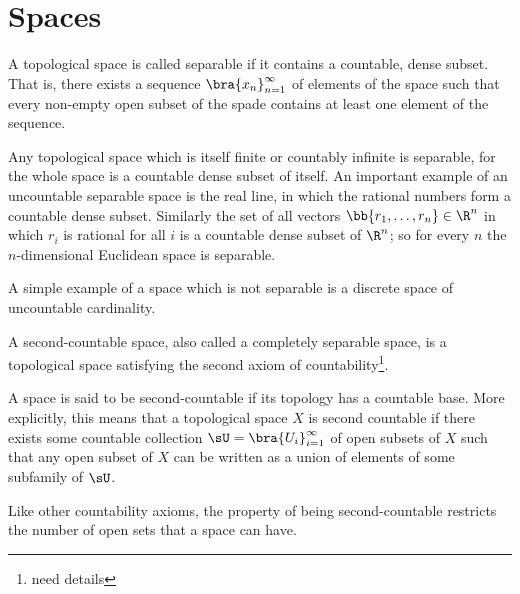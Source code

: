 \section{Spaces}

\begin{definition}\label{def:separable_space}
A topological space is called separable if it contains a countable, dense subset. That is, there exists a sequence $\bra{x_n}_{n=1}^\infty$ of elements of the space such that every non-empty open subset of the spade contains at least one element of the sequence.
\end{definition}

\begin{remark}
Any topological space which is itself finite or countably infinite is separable, for the whole space is a countable dense subset of itself. An important example of an uncountable separable space is the real line, in which the rational numbers form a countable dense subset. Similarly the set of all vectors $\bb{r_{1},\ldots ,r_{n}}\in \R^n$ in which $r_{i}$ is rational for all $i$ is a countable dense subset of $\R^n$; so for every $n$ the $n$-dimensional Euclidean space is separable.

A simple example of a space which is not separable is a discrete space of uncountable cardinality.
\end{remark}


\begin{definition}\label{def:second_countable_space}
A second-countable space, also called a completely separable space, is a topological space satisfying the second axiom of countability\footnote{need details}.

A space is said to be second-countable if its topology has a countable base. More explicitly, this means that a topological space $X$ is second countable if there exists some countable collection $\sU = \bra{U_i}_{i=1}^\infty$ of open subsets of $X$ such that any open subset of $X$ can be written as a union of elements of some subfamily of $\sU$.
\end{definition}

\begin{remark}
Like other countability axioms, the property of being second-countable restricts the number of open sets that a space can have.
\end{remark}

